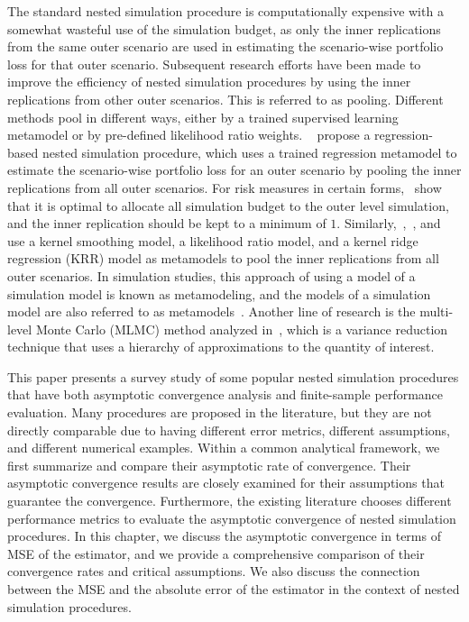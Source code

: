The standard nested simulation procedure is computationally expensive with a somewhat wasteful use of the simulation budget, as only the inner replications from the same outer scenario are used in estimating the scenario-wise portfolio loss for that outer scenario. 
Subsequent research efforts have been made to improve the efficiency of nested simulation procedures by using the inner replications from other outer scenarios. 
This is referred to as pooling. 
Different methods pool in different ways, either by a trained supervised learning metamodel or by pre-defined likelihood ratio weights.
~\cite{broadie2015risk} propose a regression-based nested simulation procedure, which uses a trained regression metamodel to estimate the scenario-wise portfolio loss for an outer scenario by pooling the inner replications from all outer scenarios.
For risk measures in certain forms,~\cite{broadie2015risk} show that it is optimal to allocate all simulation budget to the outer level simulation, and the inner replication should be kept to a minimum of $1$.
Similarly,~\cite{hong2017kernel},~\cite{feng2020optimal}, and~\cite{zhang2022sample} use a kernel smoothing model, a likelihood ratio model, and a kernel ridge regression (KRR) model as metamodels to pool the inner replications from all outer scenarios.
In simulation studies, this approach of using a model of a simulation model is known as metamodeling, and the models of a simulation model are also referred to as metamodels~\citep{barton1998simulation}.
Another line of research is the multi-level Monte Carlo (MLMC) method analyzed in~\cite{giles2019multilevel}, which is a variance reduction technique that uses a hierarchy of approximations to the quantity of interest.

This paper presents a survey study of some popular nested simulation procedures that have both asymptotic convergence analysis and finite-sample performance evaluation.
Many procedures are proposed in the literature, but they are not directly comparable due to having different error metrics, different assumptions, and different numerical examples.
Within a common analytical framework, we first summarize and compare their asymptotic rate of convergence.
Their asymptotic convergence results are closely examined for their assumptions that guarantee the convergence.
Furthermore, the existing literature chooses different performance metrics to evaluate the asymptotic convergence of nested simulation procedures.
In this chapter, we discuss the asymptotic convergence in terms of MSE of the estimator, and we provide a comprehensive comparison of their convergence rates and critical assumptions.
We also discuss the connection between the MSE and the absolute error of the estimator in the context of nested simulation procedures.

